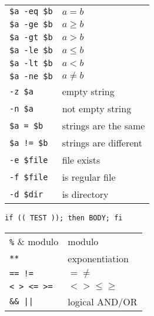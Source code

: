 \documentclass[a4paper, twocolumn]{article}
\renewcommand{\tt}{\texttt}
\begin{document}
\begin{tabular}{ll}
    \verb|$a -eq $b|    & $a = b$                                   \\
    \verb|$a -ge $b|    & $a \geq b$                                \\
    \verb|$a -gt $b|    & $a > b$                                   \\
    \verb|$a -le $b|    & $a \leq b$                                \\
    \verb|$a -lt $b|    & $a < b$                                   \\
    \verb|$a -ne $b|    & $a \neq b$                                \\
    \verb|-z $a|        & empty string                              \\
    \verb|-n $a|        & not empty string                          \\
    \verb|$a = $b|      & strings are the same                      \\
    \verb|$a != $b|     & strings are different                     \\
    \verb|-e $file|     & file exists                               \\
    \verb|-f $file|     & is regular file                           \\
    \verb|-d $dir|      & is directory
\end{tabular}

\vspace{0.5cm}
\tt{if (( TEST )); then BODY; fi}
\vspace{0.3cm}

\begin{tabular}{ll}
    \verb|%|            & modulo                                    \\
    \verb|**|           & exponentiation                            \\
    \verb|== !=|        & $= \neq$                                  \\
    \verb|< > <= >=|    & $< > \leq \geq$                           \\
    \verb!&& ||!        & logical AND/OR
\end{tabular}
\end{document}
